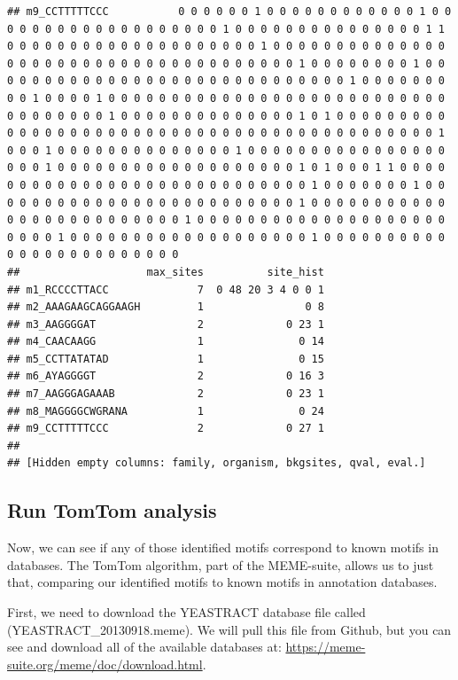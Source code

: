 \documentclass[
]{book}
\begin{document}
\begin{verbatim}
## m9_CCTTTTTCCC           0 0 0 0 0 0 1 0 0 0 0 0 0 0 0 0 0 0 0 1 0 0 0 0 0 0 0 0 0 0 0 0 0 0 0 0 0 0 0 1 0 0 0 0 0 0 0 0 0 0 0 0 0 0 0 1 1 0 0 0 0 0 0 0 0 0 0 0 0 0 0 0 0 0 0 0 0 1 0 0 0 0 0 0 0 0 0 0 0 0 0 0 0 0 0 0 0 0 0 0 0 0 0 0 0 0 0 0 0 0 0 0 0 0 0 1 0 0 0 0 0 0 0 0 1 0 0 0 0 0 0 0 0 0 0 0 0 0 0 0 0 0 0 0 0 0 0 0 0 0 0 0 0 0 1 0 0 0 0 0 0 0 0 0 1 0 0 0 0 1 0 0 0 0 0 0 0 0 0 0 0 0 0 0 0 0 0 0 0 0 0 0 0 0 0 0 0 0 0 0 0 0 0 0 0 1 0 0 0 0 0 0 0 0 0 0 0 0 0 0 1 0 1 0 0 0 0 0 0 0 0 0 0 0 0 0 0 0 0 0 0 0 0 0 0 0 0 0 0 0 0 0 0 0 0 0 0 0 0 0 0 0 0 0 0 0 1 0 0 0 1 0 0 0 0 0 0 0 0 0 0 0 0 0 0 1 0 0 0 0 0 0 0 0 0 0 0 0 0 0 0 0 0 0 0 1 0 0 0 0 0 0 0 0 0 0 0 0 0 0 0 0 0 0 0 1 0 1 0 0 0 1 1 0 0 0 0 0 0 0 0 0 0 0 0 0 0 0 0 0 0 0 0 0 0 0 0 0 0 0 0 1 0 0 0 0 0 0 0 1 0 0 0 0 0 0 0 0 0 0 0 0 0 0 0 0 0 0 0 0 0 0 0 0 0 1 0 0 0 0 0 0 0 0 0 0 0 0 0 0 0 0 0 0 0 0 0 0 0 0 0 1 0 0 0 0 0 0 0 0 0 0 0 0 0 0 0 0 0 0 0 0 0 0 0 0 1 0 0 0 0 0 0 0 0 0 0 0 0 0 0 0 0 0 0 0 1 0 0 0 0 0 0 0 0 0 0 0 0 0 0 0 0 0 0 0 0 0 0 0 0
##                    max_sites          site_hist
## m1_RCCCCTTACC              7  0 48 20 3 4 0 0 1
## m2_AAAGAAGCAGGAAGH         1                0 8
## m3_AAGGGGAT                2             0 23 1
## m4_CAACAAGG                1               0 14
## m5_CCTTATATAD              1               0 15
## m6_AYAGGGGT                2             0 16 3
## m7_AAGGGAGAAAB             2             0 23 1
## m8_MAGGGGCWGRANA           1               0 24
## m9_CCTTTTTCCC              2             0 27 1
## 
## [Hidden empty columns: family, organism, bkgsites, qval, eval.]
\end{verbatim}

\hypertarget{run-tomtom-analysis}{%
\subsection{Run TomTom analysis}\label{run-tomtom-analysis}}

Now, we can see if any of those identified motifs correspond to known
motifs in databases. The TomTom algorithm, part of the MEME-suite,
allows us to just that, comparing our identified motifs to known motifs
in annotation databases.

First, we need to download the YEASTRACT database file called
(YEASTRACT\_20130918.meme). We will pull this file from Github, but you
can see and download all of the available databases at:
\url{https://meme-suite.org/meme/doc/download.html}.
\end{document}
